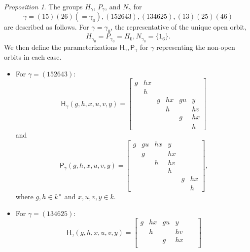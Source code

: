 \documentclass[12pt]{amsart}
\theoremstyle{Theorem}
\theoremstyle{Theorem}
\theoremstyle{Theorem}
\theoremstyle{Theorem}
\theoremstyle{Plain}
\theoremstyle{remark}
\theoremstyle{remark}
\theoremstyle{Definition}
\newtheorem{prpd}[dfn]{Proposition}
\begin{document}
\begin{prpd}
    \label{groupsforgamma}
    The groups $H_\gamma$, $P_\gamma$, and $N_\gamma$ for
    \[
        \gamma = (15)(26) ( = \gamma_0 ), (152643), (134625), (13)(25)(46)
    \]
    are described as follows. For $ \gamma = \gamma_0 $, the representative of the unique open orbit,
    \[
        H_{ \gamma_0 } = P_{ \gamma_0 } = H_0, N_{ \gamma_0 } = \{ 1_6 \}.
    \]
    We then define the parameterizations $ \mathsf{H}_\gamma, \mathsf{P}_\gamma $ for $\gamma$ representing the non-open orbits in each case.
    \begin{itemize}
        \item[\rm(a)] For $ \gamma = (152643) $:
        \[
            \mathsf{H}_\gamma ( g, h, x, u, v, y ) =
            \begin{bmatrix}
                g & hx &   &    &    &   \\
                  & h  &   &    &    &   \\
                  &    & g & hx & gu & y \\
                  &    &   & h  &    & hv\\
                  &    &   &    & g  & hx\\
                  &    &   &    &    & h
            \end{bmatrix}
        \]
        and
        \[
            \mathsf{P}_\gamma ( g, h, x, u, v, y ) =
            \begin{bmatrix}
                g & gu & hx & y  &   &   \\
                  & g  &    & hx &   &   \\
                  &    & h  & hv &   &   \\
                  &    &    & h  &   &   \\
                  &    &    &    & g & hx\\
                  &    &    &    &   & h
            \end{bmatrix}
            ,
        \]
        where $ g, h \in k^\times $ and $ x, u, v, y \in k $.
        \item[\rm(b)] For $ \gamma = (134625) $:
        \[
            \mathsf{H}_\gamma ( g, h, x, u, v, y ) = 
            \begin{bmatrix}
                g & hx & gu & y  &   &   \\
                  & h  &    & hv &   &   \\
                  &    & g  & hx &   &   \\

\end{bmatrix}\]
\end{itemize}
\end{prpd}
\end{document}
